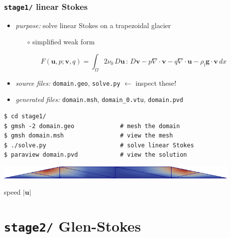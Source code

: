 \documentclass[10pt,
               hyperref={colorlinks,citecolor=DeepPink4,linkcolor=black,urlcolor=blue},
               svgnames]{beamer}
\newcommand{\bv}{\mathbf{v}}
\newcommand{\bu}{\mathbf{u}}
\newcommand{\rhoi}{\rho_{\text{i}}}
\begin{document}
\begin{frame}[fragile]
\frametitle{\texttt{stage1/} \qquad linear Stokes}

\begin{itemize}
\item \emph{purpose:} solve linear Stokes on a trapezoidal glacier

    \begin{itemize}
    \item[$\circ$] simplified weak form
    \end{itemize}
{\small
    $$F(\bu,p;\bv,q) = \int_{\Omega} 2 \nu_0\, D\bu\,:\,D\bv - p \nabla \cdot \bv - q \nabla \cdot \bu - \rhoi \mathbf{g} \cdot \bv \,dx$$
}
\item \emph{source files:} \texttt{domain.geo}, \texttt{solve.py} \hfill \alert{$\gets$ inspect these!}
\item \emph{generated files:} \texttt{domain.msh}, \texttt{domain\_0.vtu}, \texttt{domain.pvd}
\end{itemize}

\bigskip
\begin{Verbatim}
$ cd stage1/
$ gmsh -2 domain.geo             # mesh the domain
$ gmsh domain.msh                # view the mesh
$ ./solve.py                     # solve linear Stokes
$ paraview domain.pvd            # view the solution
\end{Verbatim}

\vspace{5mm}
\begin{center}
\includegraphics[width=0.9\textwidth]{figs/stage1.png}

{\tiny speed $|\bu|$}
\end{center}
\end{frame}


\section{\texttt{stage2/} \qquad Glen-Stokes}
\end{document}
